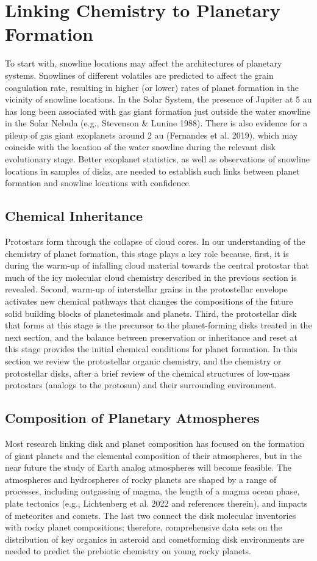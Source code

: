 \chapter{Linking Chemistry to Planetary Formation}
To start with, snowline locations may affect the architectures of planetary systems. Snowlines of different volatiles are predicted to affect the grain coagulation rate, resulting in higher (or lower) rates of planet formation in the vicinity of snowline locations. In the Solar System, the presence of Jupiter at 5 au has long been associated with gas giant formation just outside the water snowline in the Solar Nebula (e.g., Stevenson \& Lunine 1988). There is also evidence for a pileup of gas giant exoplanets around 2 au (Fernandes et al. 2019), which may coincide with the location of the water snowline during the relevant disk evolutionary stage. Better exoplanet statistics, as well as observations of snowline locations in samples of disks, are needed to establish such links between planet formation and snowline locations with confidence.
\section{Chemical Inheritance}
Protostars form through the collapse of cloud cores. In our understanding of the chemistry of planet formation, this stage plays a key role because, first, it is during the warm-up of infalling cloud material towards the central protostar that much of the icy molecular cloud chemistry described in the previous section is revealed. Second, warm-up of interstellar grains in the protostellar envelope activates new chemical pathways that changes the compositions of the future solid building blocks of planetesimals and planets. Third, the protostellar disk that forms at this stage is the precursor to the planet-forming disks treated in the next section, and the balance between preservation or inheritance and reset at this stage provides the initial chemical conditions for planet formation. In this section we review the protostellar organic chemistry, and the chemistry or protostellar disks, after a brief review of the chemical structures of low-mass protostars (analogs to the protosun) and their surrounding environment.
\section{Composition of Planetary Atmospheres}
Most research linking disk and planet composition has focused on the formation of giant planets and the elemental composition of their atmospheres, but in the near future the study of Earth analog atmospheres will become feasible. The atmospheres and hydrospheres of rocky planets are shaped by a range of processes, including outgassing of magma, the length of a magma ocean phase, plate tectonics (e.g., Lichtenberg et al. 2022 and references therein), and impacts of meteorites and comets. The last two connect the disk molecular inventories with rocky planet compositions; therefore, comprehensive data sets on the distribution of key organics in asteroid and cometforming disk environments are needed to predict the prebiotic chemistry on young rocky planets.
